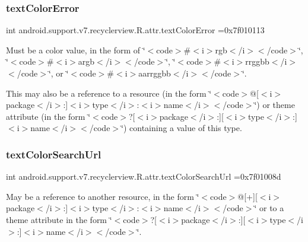 \subsubsection{\texorpdfstring{text\+Color\+Error}{textColorError}}
{\footnotesize\ttfamily int android.\+support.\+v7.\+recyclerview.\+R.\+attr.\+text\+Color\+Error =0x7f010113\hspace{0.3cm}{\ttfamily [static]}}

Must be a color value, in the form of \char`\"{}$<$code$>$\#$<$i$>$rgb$<$/i$>$$<$/code$>$\char`\"{}, \char`\"{}$<$code$>$\#$<$i$>$argb$<$/i$>$$<$/code$>$\char`\"{}, \char`\"{}$<$code$>$\#$<$i$>$rrggbb$<$/i$>$$<$/code$>$\char`\"{}, or \char`\"{}$<$code$>$\#$<$i$>$aarrggbb$<$/i$>$$<$/code$>$\char`\"{}. 

This may also be a reference to a resource (in the form \char`\"{}$<$code$>$@\mbox{[}$<$i$>$package$<$/i$>$\+:\mbox{]}$<$i$>$type$<$/i$>$\+:$<$i$>$name$<$/i$>$$<$/code$>$\char`\"{}) or theme attribute (in the form \char`\"{}$<$code$>$?\mbox{[}$<$i$>$package$<$/i$>$\+:\mbox{]}\mbox{[}$<$i$>$type$<$/i$>$\+:\mbox{]}$<$i$>$name$<$/i$>$$<$/code$>$\char`\"{}) containing a value of this type. \mbox{\label{classandroid_1_1support_1_1v7_1_1recyclerview_1_1R_1_1attr_a9dbf4ebcddb38290ea5fee13c8abbada}} 
\subsubsection{\texorpdfstring{text\+Color\+Search\+Url}{textColorSearchUrl}}
{\footnotesize\ttfamily int android.\+support.\+v7.\+recyclerview.\+R.\+attr.\+text\+Color\+Search\+Url =0x7f01008d\hspace{0.3cm}{\ttfamily [static]}}

May be a reference to another resource, in the form \char`\"{}$<$code$>$@\mbox{[}+\mbox{]}\mbox{[}$<$i$>$package$<$/i$>$\+:\mbox{]}$<$i$>$type$<$/i$>$\+:$<$i$>$name$<$/i$>$$<$/code$>$\char`\"{} or to a theme attribute in the form \char`\"{}$<$code$>$?\mbox{[}$<$i$>$package$<$/i$>$\+:\mbox{]}\mbox{[}$<$i$>$type$<$/i$>$\+:\mbox{]}$<$i$>$name$<$/i$>$$<$/code$>$\char`\"{}. 

